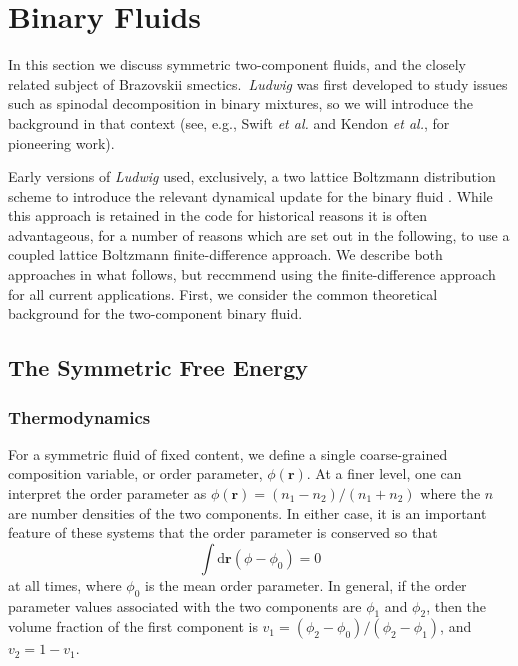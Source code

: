 %
%
%
%
%
%

\section{Binary Fluids}
\label{section-binary}

In this section we discuss symmetric two-component fluids, and the closely
related subject of Brazovskii smectics.\ \textit{Ludwig} was first developed
to study issues such as spinodal decomposition in binary mixtures,
so we will introduce the background in that
context (see, e.g., Swift \textit{et al.} \cite{swift1996} and Kendon
\textit{et al.}, \cite{kendon2001} for pioneering work).

Early versions of \textit{Ludwig} used, exclusively, a two lattice
Boltzmann distribution scheme to introduce the relevant dynamical update
for the binary fluid \cite{desplat2001}.
While this approach is retained in the code
for historical reasons it is often advantageous, for a number of reasons
which are set out in the following, to use a coupled lattice
Boltzmann finite-difference approach. We describe both approaches in what
follows, but reccmmend using the finite-difference approach for all current
applications. First, we consider
the common theoretical background for the two-component binary fluid.


\subsection{The Symmetric Free Energy}

\subsubsection{Thermodynamics}

For a symmetric fluid of fixed content, we define a single coarse-grained
composition
variable, or order parameter, $\phi(\mathbf{r})$. At a finer level,
one can interpret the order parameter as
$\phi(\mathbf{r}) = (n_1 - n_2)/(n_1 + n_2)$
where the $n$ are number densities of the two components. In either case,
it is an important
feature of these systems that the order parameter is conserved so that
\begin{equation}
\int \mathrm{d}\mathbf{r} (\phi - \phi_0) = 0
\end{equation}
at all times, where $\phi_0$ is the mean order parameter. In general,
if the order parameter values associated with the two components are
$\phi_1$ and $\phi_2$, then the volume fraction of the first component is
$v_1 = (\phi_2 - \phi_0)/(\phi_2 - \phi_1)$, and $v_2 = 1 - v_1$.

